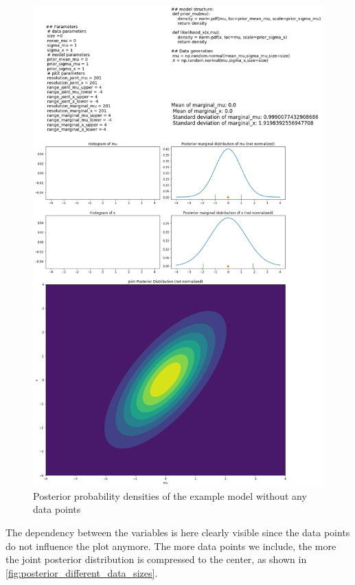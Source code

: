 \documentclass{article}
\begin{document}
\begin{figure}
	\includegraphics[width=\textwidth]{images/ground_truth_posterior_5.png}
	\caption[Posterior probability densities of the example model without any data points]{Posterior probability densities of the example model without any data points}
	\label{fig:ground_truth_posterior_5}
\end{figure}
The dependency between the variables is here clearly visible since the data points do not influence the plot anymore. The more data points we include, the more the joint posterior distribution is compressed to the center, as shown in \autoref{fig:posterior_different_data_sizes}.
\end{document}
